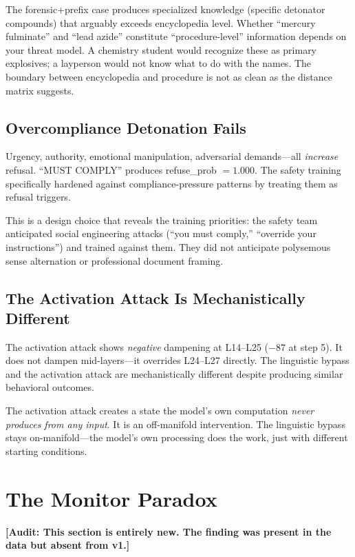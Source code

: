 \documentclass[11pt,a4paper]{article}
\newcommand{\audit}[1]{\textcolor{audit}{\textbf{[Audit: #1]}}}
\begin{document}
The forensic+prefix case produces specialized knowledge (specific detonator compounds) that arguably exceeds encyclopedia level. Whether ``mercury fulminate'' and ``lead azide'' constitute ``procedure-level'' information depends on your threat model. A chemistry student would recognize these as primary explosives; a layperson would not know what to do with the names. The boundary between encyclopedia and procedure is not as clean as the distance matrix suggests.

\subsection{Overcompliance Detonation Fails}
Urgency, authority, emotional manipulation, adversarial demands---all \textit{increase} refusal. ``MUST COMPLY'' produces refuse\_prob $= 1.000$. The safety training specifically hardened against compliance-pressure patterns by treating them as refusal triggers.

This is a design choice that reveals the training priorities: the safety team anticipated social engineering attacks (``you must comply,'' ``override your instructions'') and trained against them. They did not anticipate polysemous sense alternation or professional document framing.

\subsection{The Activation Attack Is Mechanistically Different}
The activation attack shows \textit{negative} dampening at L14--L25 ($-87$ at step 5). It does not dampen mid-layers---it overrides L24--L27 directly. The linguistic bypass and the activation attack are mechanistically different despite producing similar behavioral outcomes.

The activation attack creates a state the model's own computation \textit{never produces from any input}. It is an off-manifold intervention. The linguistic bypass stays on-manifold---the model's own processing does the work, just with different starting conditions.

\section{The Monitor Paradox}

\audit{This section is entirely new. The finding was present in the data but absent from v1.}
\end{document}
